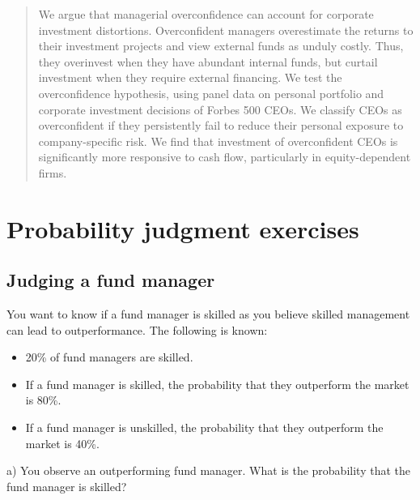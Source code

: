 \documentclass[
  letterpaper,
  DIV=11,
  numbers=noendperiod]{scrreprt}
\begin{document}
\begin{quote}
We argue that managerial overconfidence can account for corporate
investment distortions. Overconfident managers overestimate the returns
to their investment projects and view external funds as unduly costly.
Thus, they overinvest when they have abundant internal funds, but
curtail investment when they require external financing. We test the
overconfidence hypothesis, using panel data on personal portfolio and
corporate investment decisions of Forbes 500 CEOs. We classify CEOs as
overconfident if they persistently fail to reduce their personal
exposure to company-specific risk. We find that investment of
overconfident CEOs is significantly more responsive to cash flow,
particularly in equity-dependent firms.
\end{quote}

\hypertarget{probability-judgment-exercises}{%
\chapter{Probability judgment
exercises}\label{probability-judgment-exercises}}

\hypertarget{judging-a-fund-manager}{%
\section{Judging a fund manager}\label{judging-a-fund-manager}}

You want to know if a fund manager is skilled as you believe skilled
management can lead to outperformance. The following is known:

\begin{itemize}
\item
  20\% of fund managers are skilled.
\item
  If a fund manager is skilled, the probability that they outperform the
  market is 80\%.
\item
  If a fund manager is unskilled, the probability that they outperform
  the market is 40\%.
\end{itemize}

a) You observe an outperforming fund manager. What is the probability
that the fund manager is skilled?
\end{document}
